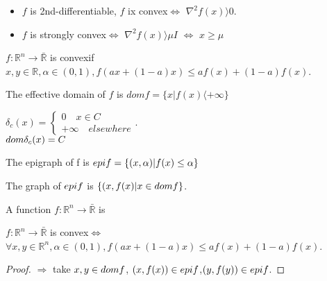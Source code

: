 \documentclass[11pt,fleqn]{book} %
\def\R{\mathbb{R}}
\newcommand{\cvx}{convex}
\begin{document}
\begin{CJK}{UTF8}{gkai}
\begin{remark}
\begin{itemize}
\item $f$ is 2nd-differentiable, $f$ ix \cvx $\iff$ $\nabla^2f(x) \rangle  0$.
\item $f$ is strongly \cvx $\iff$ $\nabla^2f(x) \rangle  \mu I$ $\iff$ $x \ge \mu$
\end{itemize}
\end{remark}
\begin{definition}[2]
$f : \R^n \to \bar{\R} $ is \cvx  if $x, y  \in \R , \alpha \in (0,1), f(ax + (1-a)x) \le af(x) + (1-a)f(x)$.  
\end{definition}
The effective domain of $f$ is $dom f = \{x | f(x) \langle + \infty \}$ 
\begin{example}
$\delta_c(x) = \begin{cases}
0 \quad  x \in C \\
+ \infty \quad elsewhere
\end{cases}$.\\
$dom \space \delta_c(x) = C$
\end{example}
\begin{definition}[Epigraph]
The epigraph of f is $epi \space f = \{(x,\alpha) | f(x) \le \alpha\}$
\end{definition}
The graph of $epi \space f$ is $\{ (x,f(x) | x \in dom \space f\}$.
\begin{definition}[III]
A function $f : \R^n \to \bar{\R}$ is %
\end{definition}
\begin{theorem}
$f : \R^n \to \bar{\R}$ is \cvx  $\iff$ $\forall x,y \in \R^n, \alpha \in (0,1), f(ax + (1-a)x) \le af(x) + (1-a)f(x)$.
\end{theorem}
\begin{proof}
$\Rightarrow$ take $x,y \in dom \space f$, $(x,f(x)) \in epi \space f$,$(y,f(y)) \in epi \space f$.
\end{proof}


\end{CJK}
\end{document}
